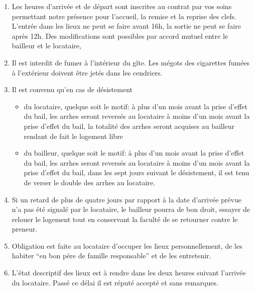 \documentclass[a4paper,11pt]{article}
\begin{document}
\begin{enumerate}

\item Les heures d’arrivée et de départ sont inscrites  au contrat par vos soins permettant notre présence pour l’accueil, la remise et la reprise des clefs. L'entrée dans les lieux ne peut se faire avant 16h, la sortie ne peut se faire après 12h.
Des modifications sont possibles par accord mutuel entre le bailleur et le locataire,
 


\item Il est interdit de fumer à l’intérieur du gîte. Les mégots des cigarettes fumées à l'extérieur doivent être jetés dans les cendriers.

\item Il est convenu qu'en cas de désistement \\


\begin{itemize}
\item du locataire, quelque soit le motif:
\subitem à plus d'un mois avant la prise d'effet du bail, les arrhes seront reversés au locataire
\subitem à moins d'un mois avant la prise d'effet du bail, la totalité des arrhes seront acquises au bailleur rendant de fait le logement libre
\item du bailleur, quelque soit le motif:
\subitem à plus d'un mois avant la prise d'effet du bail, les arrhes seront reversés au locataire
\subitem à moins d'un mois avant la prise d'effet du bail, dans les sept jours suivant le désistement, il est tenu de verser le double des arrhes au locataire.
\end{itemize}



\item Si un retard de plus de quatre jours par rapport à la date d’arrivée prévue n’a pas été signalé par le locataire, le bailleur pourra de bon droit, essayer de relouer le logement tout en conservant la faculté de se retourner contre le preneur.



\item Obligation est faite au locataire d’occuper les lieux personnellement, de les habiter “en bon père de famille responsable” et de les entretenir.

\item L'état descriptif des lieux est à rendre dans les deux heures suivant l'arrivée du locataire. Passé ce délai il est réputé accepté et sans remarques.



\end{enumerate}
\end{document}
